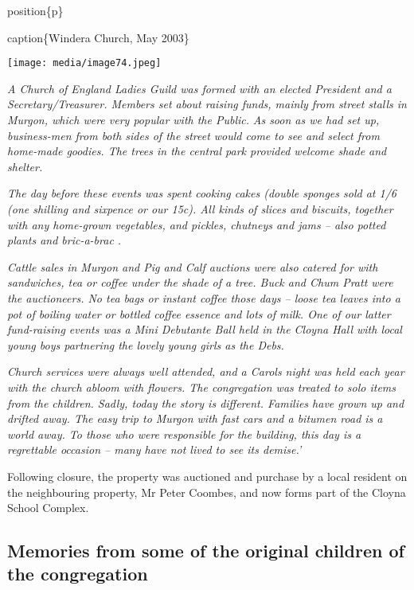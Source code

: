 position\{p\}

caption\{Windera Church, May 2003\}

\texttt{[image: media/image74.jpeg]}

\emph{A Church of England Ladies Guild was formed with an elected President and a Secretary/Treasurer. Members set about raising funds, mainly from street stalls in Murgon, which were very popular with the Public.} \emph{As soon as we had set up, business-men from both sides of the street would come to see and select from home-made goodies. The trees in the central park provided welcome shade and shelter.}

\emph{The day before these events was spent cooking cakes (double sponges sold at 1/6 (one shilling and sixpence or our 15c). All kinds of slices and biscuits, together with any home-grown vegetables, and pickles, chutneys and jams -- also potted plants and bric-a-brac .}

\emph{Cattle sales in Murgon and Pig and Calf auctions were also catered for with sandwiches, tea or coffee under the shade of a tree. Buck and Chum Pratt were the auctioneers. No tea bags or instant coffee those days -- loose tea leaves into a pot of boiling water or bottled coffee essence and lots of milk. One of our latter fund-raising events was a Mini Debutante Ball held in the Cloyna Hall with local young boys partnering the lovely young girls as the Debs.}

\emph{Church services were always well attended, and a Carols night was held each year with the church abloom with flowers. The congregation was treated to solo items from the children. Sadly, today the story is different. Families have grown up and drifted away. The easy trip to Murgon with fast cars and a bitumen road is a world away. To those who were responsible for the building, this day is a regrettable occasion -- many have not lived to see its demise.'}

Following closure, the property was auctioned and purchase by a local resident on the neighbouring property, Mr Peter Coombes, and now forms part of the Cloyna School Complex.

\hypertarget{memories-from-some-of-the-original-children-of-the-congregation}{%
\subsection{Memories from some of the original children of the congregation}\label{memories-from-some-of-the-original-children-of-the-congregation}}

